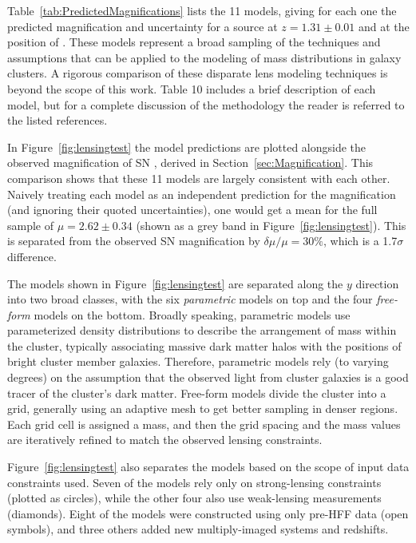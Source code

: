 Table~\ref{tab:PredictedMagnifications} lists the 11 models, giving
for each one the predicted magnification and uncertainty for a source
at $z=1.31\pm0.01$ and at the position of \tomas.  These
models represent a broad sampling of the techniques and assumptions
that can be applied to the modeling of mass distributions in galaxy
clusters. A rigorous comparison of these disparate lens modeling
techniques is beyond the scope of this work. Table 10 includes a brief
description of each model, but for a complete discussion of the
methodology the reader is referred to the listed references.

In Figure~\ref{fig:lensingtest} the model predictions are plotted
alongside the observed magnification of SN \tomas, derived in
Section~\ref{sec:Magnification}.  This comparison shows that these 11
models are largely consistent with each other. Naively treating each
model as an independent prediction for the magnification (and ignoring
their quoted uncertainties), one would get a mean for the full sample
of $\mu=2.62\pm0.34$ (shown as a grey band in
Figure~\ref{fig:lensingtest}).  This is separated from the observed SN
magnification by $\delta\mu/\mu=30\%$, which is a 1.7$\sigma$
difference.

The models shown in Figure~\ref{fig:lensingtest} are separated along
the $y$ direction into two broad classes, with the six {\it
parametric} models on top and the four {\it free-form} models on the
bottom.  Broadly speaking, parametric models use parameterized density
distributions to describe the arrangement of mass within the cluster,
typically associating massive dark matter halos with the positions of
bright cluster member galaxies. Therefore, parametric models rely (to
varying degrees) on the assumption that the observed light from
cluster galaxies is a good tracer of the cluster's dark matter.
Free-form models divide the cluster into a grid, generally using an
adaptive mesh to get better sampling in denser regions. Each grid cell
is assigned a mass, and then the grid spacing and the mass values are
iteratively refined to match the observed lensing constraints.  

Figure~\ref{fig:lensingtest} also separates the models based on the
scope of input data constraints used.  Seven of the models rely only
on strong-lensing constraints (plotted as circles), while the other
four also use weak-lensing measurements (diamonds).  Eight of the
models were constructed using only pre-HFF data (open symbols), and
three others added new multiply-imaged systems and redshifts.

